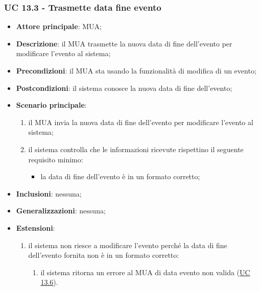     \subsubsection{UC 13.3 - Trasmette data fine evento} \label{sec:UC13.3}
    \begin{itemize}
        \item \textbf{Attore principale}: MUA;
        \item \textbf{Descrizione}: il MUA trasmette la nuova data di fine dell'evento per modificare l'evento al sistema;
        \item \textbf{Precondizioni}: il MUA sta usando la funzionalità di modifica di un evento;
        \item \textbf{Postcondizioni}: il sistema conosce la nuova data di fine dell'evento;
        \item \textbf{Scenario principale}:
            \begin{enumerate}
                \item il MUA invia la nuova data di fine dell'evento per modificare l'evento al sistema;
                \item il sistema controlla che le informazioni ricevute rispettino il seguente requisito minimo:
                    \begin{itemize}
                        \item la data di fine dell'evento è in un formato corretto;
                    \end{itemize}
            \end{enumerate}
        \item \textbf{Inclusioni}: nessuna;
        \item \textbf{Generalizzazioni}: nessuna;
        \item \textbf{Estensioni}:
            \begin{enumerate}[label=\alph*.]
                \item il sistema non riesce a modificare l'evento perché la data di fine dell'evento fornita non è in un formato corretto:
                \begin{enumerate}[label=\arabic*.]
                    \item il sistema ritorna un errore al MUA di data evento non valida (\hyperref[sec:UC13.6]{UC 13.6}).
                \end{enumerate}
            \end{enumerate}
    \end{itemize}

